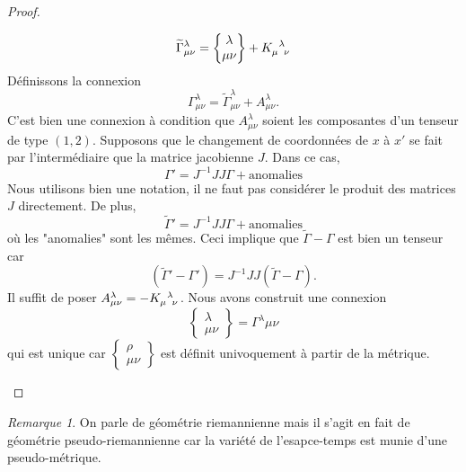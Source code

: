 \documentclass[a4paper,11pt]{report}
\theoremstyle{definition}
\theoremstyle{plain}
\theoremstyle{definition}
\theoremstyle{remark}
\newtheorem{rmk}{Remarque}[chapter]
\newcommand{\chris}[3]{\begin{Bmatrix}#1\\#2#3\end{Bmatrix}}
\begin{document}
\begin{proof}
\begin{enumerate}[label = \textit{\roman*)}]
\begin{equation}
                        \widetilde{\Gamma}^\lambda_{\mu\nu}=\chris{\lambda}{\mu}{\nu}+K\indices{_\mu^\lambda_\nu}
                        \end{equation}
                        Définissons la connexion
                        \begin{equation}
                            \Gamma^\lambda_{\mu\nu} = \widetilde{\Gamma}^\lambda_{\mu\nu} + A^\lambda_{\mu\nu}.
                        \end{equation}
                        C'est bien une connexion à condition que $A^\lambda_{\mu\nu}$ soient les composantes d'un tenseur de type $(1,2)$. Supposons que le changement de coordonnées de $x$ à $x'$ se fait par l'intermédiaire que la matrice jacobienne $J$. Dans ce cas,
                        \begin{equation}
                            \Gamma' = J^{-1}JJ\Gamma + \text{anomalies}
                        \end{equation}
                        Nous utilisons bien une notation, il ne faut pas considérer le produit des matrices $J$ directement. De plus,
                        \begin{equation}
                            \widetilde{\Gamma}' = J^{-1}JJ\Gamma + \text{anomalies}
                        \end{equation}
                        où les "anomalies" sont les mêmes. Ceci implique que $\widetilde{\Gamma}-\Gamma$ est bien un tenseur car
                        \begin{equation}
                            (\widetilde{\Gamma}'-\Gamma') = J^{-1}JJ(\widetilde{\Gamma}-\Gamma).
                        \end{equation}
                        Il suffit de poser $A^\lambda_{\mu\nu}=-K\indices{_\mu^\lambda_\nu}$. Nous avons construit une connexion
                        \begin{equation}
                            \chris{\lambda}{\mu}{\nu}=\Gamma^\lambda{\mu\nu}
                        \end{equation}
                        qui est unique car $\chris{\rho}{\mu}{\nu}$ est définit univoquement à partir de la métrique.
                    \end{enumerate}
                \end{proof}
                
                \begin{rmk}
                    On parle de géométrie riemannienne mais il s'agit en fait de géométrie pseudo-riemannienne car la variété de l'esapce-temps est munie d'une pseudo-métrique.
                \end{rmk}
                
\end{document}
